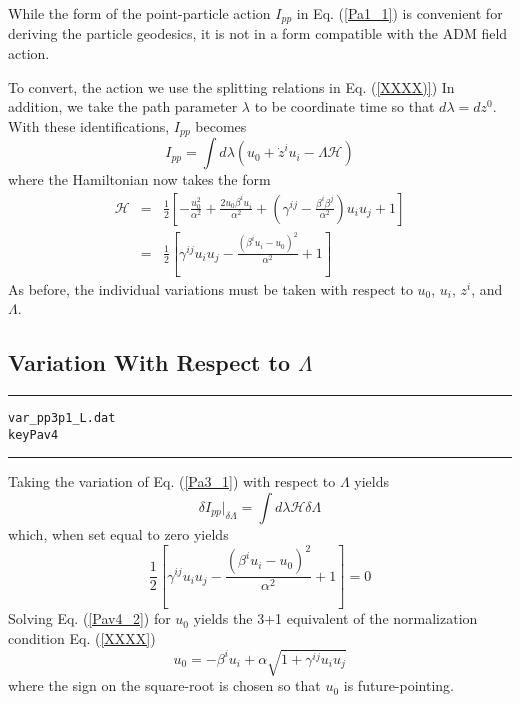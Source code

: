 \documentclass[12pt]{article}
\begin{document}
While the form of the point-particle action $ I_{pp} $ in Eq. (\ref{Pa1_1}) is
convenient for deriving the particle geodesics, it is not in a form compatible
with the ADM field action.

To convert, the action we use the splitting relations in Eq. (\ref{XXXX)}) In
addition, we take the path parameter $ \lambda $ to be coordinate time
so that $ d \lambda = d {z ^ 0} $. With these identifications, $ I_{pp} $
becomes
\begin{equation}\label{Pa3_1}
I_{pp} = \int d \lambda \left( {u}_{0} + {\dot z}^{i} {u}_{i} - \Lambda \mathcal{H} \right)
\end{equation}
where the Hamiltonian now takes the form
\begin{eqnarray}\label{Pa3_2}
\mathcal{H} & = & \frac{1}{2} \left[ - \frac{ {u}_{0} ^2 }{ \alpha ^2 }
+ \frac{ 2 {u}_{0} {\beta}^{i} {u}_{i} }{ \alpha ^2 }
+ \left( {\gamma}^{i j} - \frac{ {\beta}^{i} {\beta}^{j} }
{ \alpha ^2} \right)
{u}_{i} {u}_{j} + 1 \right] \nonumber \\
& = & \frac{1}{2} \left[ {\gamma}^{i j} {u}_{i} {u}_{j}
-\frac{ \left( {\beta}^{i} {u}_{i} - {u}_{0} \right) ^2}{ \alpha ^2 }
+ 1 \right]
\end{eqnarray}
As before, the individual variations must be taken with respect to
$ {u}_{0} $, $ {u}_{i} $, $ {z ^ i} $, and $ \Lambda $.


\subsection{Variation With Respect to $ \Lambda $}

\clearpage
\vspace{5mm}
\hrule
\begin{alltt}
  var_pp3p1_L.dat
  key Pav4
\end{alltt}
\hrule
\vspace{5mm}

Taking the variation of Eq. (\ref{Pa3_1}) with respect to $ \Lambda $ yields
\begin{equation}\label{Pav4_1}
{ \delta I_{pp} } |_{\delta \Lambda } = \int d \lambda \mathcal{H} \delta \Lambda
\end{equation}
which, when set equal to zero yields
\begin{equation}\label{Pav4_2}
\frac{1}{2} \left[ {\gamma}^{i j} {u}_{i} {u}_{j}
-\frac{ \left( {\beta}^{i} {u}_{i} - {u}_{0} \right) ^2}{ \alpha ^2 }
+ 1 \right] = 0
\end{equation}
Solving Eq. (\ref{Pav4_2}) for $ {u}_{0} $ yields the 3+1 equivalent of
the normalization condition Eq. (\ref{XXXX})
\begin{equation}\label{Pav4_3}
{u}_{0} = - {\beta}^{i} {u}_{i} + \alpha
\sqrt{ 1 + {\gamma}^{i j} {u}_{i} {u}_{j} }
\end{equation}
where the sign on the square-root is chosen so that $ {u}_{0} $ is
future-pointing.
\end{document}
